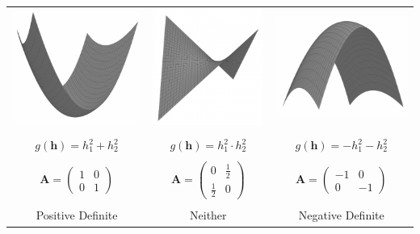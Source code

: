 \begin{table}[h]
\begin{tabularx}{\textwidth}{ccc}
\includegraphics[width=0.3\linewidth]{figures/wk-3/fig-39.png} & \includegraphics[width=0.3\linewidth]{figures/wk-3/fig-40.png} & \includegraphics[width=0.3\linewidth]{figures/wk-3/fig-41.png} \\ \\
$g(\mathbf{h})=h_1^2+h_2^2$ & $g(\mathbf{h})=h_1^2 \cdot h_2^2$ & $g(\mathbf{h})=-h_1^2-h_2^2$ \\ \\
$\boldsymbol{A}=\left(\begin{array}{ll}1 & 0 \\ 0 & 1\end{array}\right)$ & $\boldsymbol{A}=\left(\begin{array}{ll}0 & \frac{1}{2} \\ \frac{1}{2} & 0\end{array}\right)$ & $\boldsymbol{A}=\left(\begin{array}{cc}-1 & 0 \\ 0 & -1\end{array}\right)$ \\ \\
Positive Definite & Neither & Negative Definite
\end{tabularx}
\end{table}

